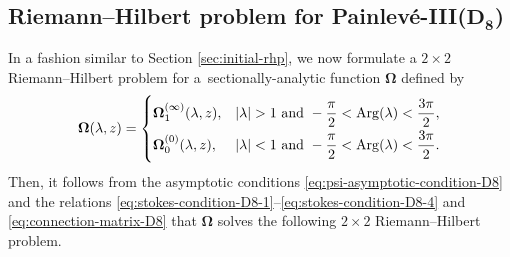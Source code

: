 \documentclass[11pt]{article}
\numberwithin{equation}{section}
\numberwithin{equation}{section}
\renewcommand{\arg}{\operatorname{Arg}}
\begin{document}
\subsection[Riemann--Hilbert problem for Painlev\'e-III(D\_8)]{Riemann--Hilbert problem for Painlev\'e-III($\boldsymbol{D_8}$)} In a fashion similar to Section \ref{sec:initial-rhp}, we now formulate a $2\times 2$ Riemann--Hilbert problem for a~sectionally-analytic function ${\mathbf{\Omega}}$ defined by
\[
{\mathbf{\Omega}}(\lambda, z) =
 \begin{cases}
\mathbf \Omega_1^{(\infty)}(\lambda, z) , & |\lambda| >1 \ \text{and} \ -\dfrac{\pi}{2} < \arg (\lambda) < \dfrac{3\pi}{2}, \vspace{1mm}\\
\mathbf \Omega_0^{(0)}(\lambda, z) , & |\lambda| <1 \ \text{and} \ -\dfrac{\pi}{2} < \arg (\lambda) < \dfrac{3\pi}{2}.
\end{cases}
\]
Then, it follows from the asymptotic conditions \eqref{eq:psi-asymptotic-condition-D8} and the relations \eqref{eq:stokes-condition-D8-1}--\eqref{eq:stokes-condition-D8-4} and \eqref{eq:connection-matrix-D8} that $\mathbf{\Omega}$ solves the following $2 \times 2$ Riemann--Hilbert problem.
\end{document}
